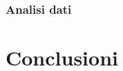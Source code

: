 \documentclass[11pt, a4paper]{article}
\numberwithin{equation}{section} %
\begin{document}

\subsubsection{Analisi dati}


\section{Conclusioni}

\end{document}
